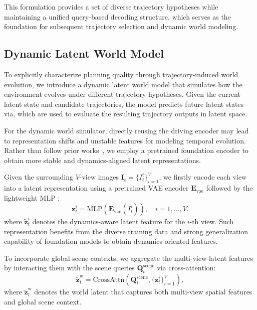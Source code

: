 
This formulation provides a set of diverse trajectory hypotheses while maintaining a unified query-based decoding structure, which serves as the foundation for subsequent trajectory selection and dynamic world modeling.

\subsection{Dynamic Latent World Model}
\label{dy_world}

To explicitly characterize planning quality through trajectory-induced world evolution, we introduce a dynamic latent world model that simulates how the environment evolves under different trajectory hypotheses. Given the current latent state and candidate trajectories, the model predicts future latent states via, which are used to evaluate the resulting trajectory outputs in latent space.

For the dynamic world simulator, directly reusing the driving encoder may lead to representation shifts and unstable features for modeling temporal evolution.  Rather than follow prior works~\cite{li2024law,li2024ssr}, we employ a pretrained foundation encoder to obtain more stable and dynamics-aligned latent representations.

Given the surrounding $V$-view images $\mathbf{I}_t = \{ I_t^i \}_{i=1}^V$, we firstly encode each view into a latent representation using a pretrained VAE encoder $\mathbf{E}_{\text{vae}}$ followed by the lightweight MLP :
\begin{equation}
\mathbf{z}_t^i = \mathrm{MLP}(\mathbf{E}_{\text{vae}}(I_t^i)), \quad i = 1, \dots, V.
\end{equation}
where $\tilde{\mathbf{z}}_t^i$ denotes the dynamics-aware latent feature for the $i$-th view. Such representation benefits from the diverse training data and strong generalization capability of foundation models to obtain dynamics-oriented features.



To incorporate global scene contexts, we aggregate the multi-view latent features by interacting them with the scene queries $\mathbf{Q}_t^{\text{scene}}$ via cross-attention:
\small{
\begin{equation}
\tilde{\mathbf{z}}_t^{\text{w}} = \mathrm{CrossAttn}(\mathbf{Q}_t^{\text{scene}}, \{\mathbf{z}_t^i\}_{i=1}^V),
\end{equation}}
where $\tilde{\mathbf{z}}_t^{\text{w}}$ denotes the world latent that captures both multi-view spatial features and global scene context.

